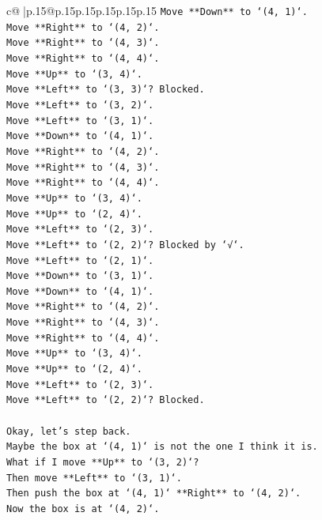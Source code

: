 \documentclass{article}
\begin{document}
{\begin{supertabular}{c@{$\;$}|p{.15\linewidth}@{}p{.15\linewidth}p{.15\linewidth}p{.15\linewidth}p{.15\linewidth}p{.15\linewidth}}
{{{\texttt{Move **Down** to `(4, 1)`.} \\
\texttt{Move **Right** to `(4, 2)`.} \\
\texttt{Move **Right** to `(4, 3)`.} \\
\texttt{Move **Right** to `(4, 4)`.} \\
\texttt{Move **Up** to `(3, 4)`.} \\
\texttt{Move **Left** to `(3, 3)`? Blocked.} \\
\texttt{Move **Left** to `(3, 2)`.} \\
\texttt{Move **Left** to `(3, 1)`.} \\
\texttt{Move **Down** to `(4, 1)`.} \\
\texttt{Move **Right** to `(4, 2)`.} \\
\texttt{Move **Right** to `(4, 3)`.} \\
\texttt{Move **Right** to `(4, 4)`.} \\
\texttt{Move **Up** to `(3, 4)`.} \\
\texttt{Move **Up** to `(2, 4)`.} \\
\texttt{Move **Left** to `(2, 3)`.} \\
\texttt{Move **Left** to `(2, 2)`? Blocked by `√`.} \\
\texttt{Move **Left** to `(2, 1)`.} \\
\texttt{Move **Down** to `(3, 1)`.} \\
\texttt{Move **Down** to `(4, 1)`.} \\
\texttt{Move **Right** to `(4, 2)`.} \\
\texttt{Move **Right** to `(4, 3)`.} \\
\texttt{Move **Right** to `(4, 4)`.} \\
\texttt{Move **Up** to `(3, 4)`.} \\
\texttt{Move **Up** to `(2, 4)`.} \\
\texttt{Move **Left** to `(2, 3)`.} \\
\texttt{Move **Left** to `(2, 2)`? Blocked.} \\
\\ 
\texttt{Okay, let's step back.} \\
\texttt{Maybe the box at `(4, 1)` is not the one I think it is.} \\
\texttt{What if I move **Up** to `(3, 2)`?} \\
\texttt{Then move **Left** to `(3, 1)`.} \\
\texttt{Then push the box at `(4, 1)` **Right** to `(4, 2)`.} \\
\texttt{Now the box is at `(4, 2)`.} \\
}}}
\end{supertabular}}
\end{document}
